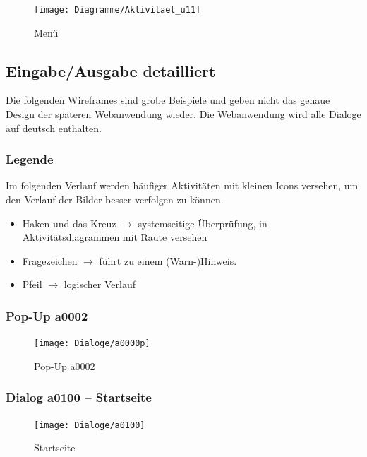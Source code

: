 \documentclass[a4paper,12pt,oneside]{scrartcl}
\begin{document}
\begin{figure}[!htbp]
\centering
\noindent\texttt{[image: Diagramme/Aktivitaet\_u11]}
\caption{Menü}
\end{figure}
\FloatBarrier


\newpage
\subsection{Eingabe/Ausgabe detailliert}
Die folgenden Wireframes sind grobe Beispiele und geben nicht das genaue Design der späteren Webanwendung wieder.
Die Webanwendung wird alle Dialoge auf deutsch enthalten.

\subsubsection*{Legende}
Im folgenden Verlauf werden häufiger Aktivitäten mit kleinen Icons versehen, um den Verlauf der Bilder besser verfolgen zu können.
\begin{itemize}
	\item Haken und das Kreuz $\rightarrow$  systemseitige Überprüfung, in Aktivitätsdiagrammen mit Raute versehen
	\item Fragezeichen $\rightarrow$ führt zu einem (Warn-)Hinweis.
	\item Pfeil $\rightarrow$ logischer Verlauf
\end{itemize}


\subsubsection{Pop-Up a0002}
\begin{figure}[!htbp]
\centering
\noindent\texttt{[image: Dialoge/a0000p]}
\caption{Pop-Up a0002}
\end{figure}
\FloatBarrier

\newpage
\subsubsection{Dialog a0100 – Startseite}
\begin{figure}[!htbp]
\centering
\noindent\texttt{[image: Dialoge/a0100]}
\caption{Startseite}
\end{figure}
\FloatBarrier
\end{document}

